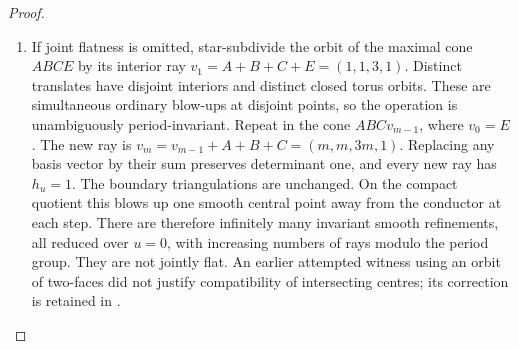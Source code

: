 \begin{proof}
\begin{enumerate}[label=\arabic*.,leftmargin=*]
\item If joint flatness is omitted, star-subdivide the orbit of the
maximal cone $ABCE$ by its interior ray
$v_1=A+B+C+E=(1,1,3,1)$. Distinct translates have disjoint
interiors and distinct closed torus orbits. These are simultaneous
ordinary blow-ups at disjoint points, so the operation is
unambiguously period-invariant. Repeat in the cone $ABCv_{m-1}$,
where $v_0=E$. The new ray is
$v_m=v_{m-1}+A+B+C=(m,m,3m,1)$. Replacing any basis vector
by their sum preserves determinant one, and every new ray has
$h_u=1$. The boundary triangulations are unchanged. On the
compact quotient this blows up one smooth central point away
from the conductor at each step. There are therefore infinitely
many invariant smooth refinements, all reduced over $u=0$, with
increasing numbers of rays modulo the period group. They are
not jointly flat. An earlier attempted witness using an orbit
of two-faces did not justify compatibility of intersecting
centres; its correction is retained in
.
\end{enumerate}
\end{proof}


